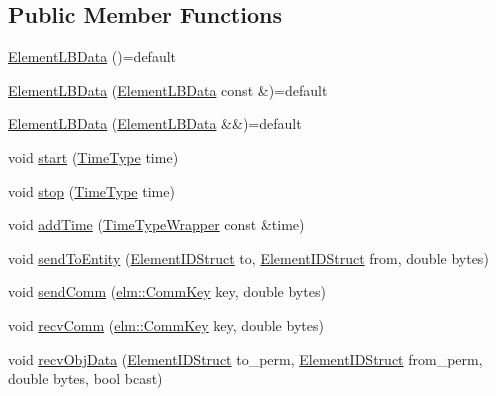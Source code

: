 \subsection*{Public Member Functions}
\begin{DoxyCompactItemize}
\item 
\hyperlink{structvt_1_1elm_1_1_element_l_b_data_aa7a5f68f276e0d3ae1279bb0f3050e4d}{Element\+L\+B\+Data} ()=default
\item 
\hyperlink{structvt_1_1elm_1_1_element_l_b_data_a2aa0d177c123d04ac24342b9558f3c46}{Element\+L\+B\+Data} (\hyperlink{structvt_1_1elm_1_1_element_l_b_data}{Element\+L\+B\+Data} const \&)=default
\item 
\hyperlink{structvt_1_1elm_1_1_element_l_b_data_a8ab77d61c0c9351e21329445e7a7b844}{Element\+L\+B\+Data} (\hyperlink{structvt_1_1elm_1_1_element_l_b_data}{Element\+L\+B\+Data} \&\&)=default
\item 
void \hyperlink{structvt_1_1elm_1_1_element_l_b_data_a19e990ccbc5b1090e8d8385e19af760a}{start} (\hyperlink{namespacevt_a876a9d0cd5a952859c72de8a46881442}{Time\+Type} time)
\item 
void \hyperlink{structvt_1_1elm_1_1_element_l_b_data_a96ccd1c4f6ec13365ca9d483eab8944c}{stop} (\hyperlink{namespacevt_a876a9d0cd5a952859c72de8a46881442}{Time\+Type} time)
\item 
void \hyperlink{structvt_1_1elm_1_1_element_l_b_data_a341e4d6ec3becd2b24ceab9be768f44c}{add\+Time} (\hyperlink{structvt_1_1_time_type_wrapper}{Time\+Type\+Wrapper} const \&time)
\item 
void \hyperlink{structvt_1_1elm_1_1_element_l_b_data_aa4d5faecce53f1ad3d4565a4e7b1cd10}{send\+To\+Entity} (\hyperlink{structvt_1_1elm_1_1_element_i_d_struct}{Element\+I\+D\+Struct} to, \hyperlink{structvt_1_1elm_1_1_element_i_d_struct}{Element\+I\+D\+Struct} from, double bytes)
\item 
void \hyperlink{structvt_1_1elm_1_1_element_l_b_data_ab7360fde34acf4dafafc8335617d8b6b}{send\+Comm} (\hyperlink{structvt_1_1elm_1_1_comm_key}{elm\+::\+Comm\+Key} key, double bytes)
\item 
void \hyperlink{structvt_1_1elm_1_1_element_l_b_data_af19f7cc95b8139b7aeec788e6450f28f}{recv\+Comm} (\hyperlink{structvt_1_1elm_1_1_comm_key}{elm\+::\+Comm\+Key} key, double bytes)
\item 
void \hyperlink{structvt_1_1elm_1_1_element_l_b_data_abe5161d28be7bccf79081ee9e8408ead}{recv\+Obj\+Data} (\hyperlink{structvt_1_1elm_1_1_element_i_d_struct}{Element\+I\+D\+Struct} to\+\_\+perm, \hyperlink{structvt_1_1elm_1_1_element_i_d_struct}{Element\+I\+D\+Struct} from\+\_\+perm, double bytes, bool bcast)

\end{DoxyCompactItemize}
